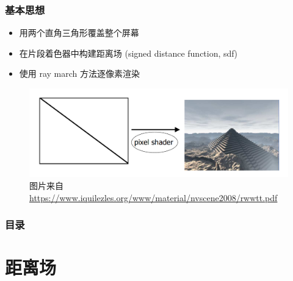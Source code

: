 \documentclass[aspectratio=169]{ctexbeamer} %
\begin{document}
\begin{frame}
    \frametitle{基本思想}
    \begin{itemize}[<+->]
        \item 用两个直角三角形覆盖整个屏幕
        \item 在片段着色器中构建距离场 (signed distance function, sdf) %
        \item 使用 ray march 方法逐像素渲染 %
    \end{itemize}
    \begin{figure}[htbp]
        \centering
        \includegraphics[height=.5\textheight]{images/pre/iq_2tri.pdf}
        \caption{\footnotesize 图片来自 \url{https://www.iquilezles.org/www/material/nvscene2008/rwwtt.pdf}}
        \label{fig:iq_2tri}
    \end{figure}
\end{frame}

\begin{frame}
    \frametitle{目录}
    \tableofcontents
\end{frame}

\section{距离场}
\end{document}
